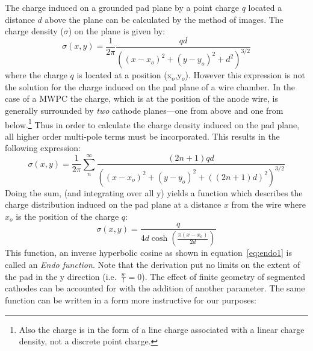 \documentclass[twoside]{article}
\begin{document}
The charge induced on a grounded pad plane by a point charge $q$ located
a distance $d$ above the plane can be calculated by the method of
images.  The charge density ($\sigma$) on the plane is given by:
\begin{equation}
  \sigma (x,y) = \frac{1}{2 \pi} \frac{q d}{((x-x_{o})^{2} + (y-y_{o})^{2} + d^{2})^{3/2}}
\label{eq:imageQ}
\end{equation}
where the charge $q$ is located at a position (x$_{o}$,y$_{o}$).  However
this expression is not the solution for the charge induced on the pad
plane of a wire chamber.  In the case of a MWPC the charge, which
is at the position of the anode wire, is generally surrounded by {\em two}
cathode planes---one from
above and one from below.\footnote{Also the charge is in the form of
  a line charge associated with a linear charge density, not a
  discrete point charge.}
Thus in order to calculate the charge density induced on the pad
plane, all higher order multi-pole terms must be incorporated.
This results in the following expression:
\begin{equation}
\sigma (x,y) = \frac{1}{2 \pi} \sum_{n}^{\infty} \frac{(2n+1) q d}{((x-x_{o})^{2} + (y-y_{o})^{2} + ((2n+1) d)^{2})^{3/2}}
\label{eq:imageQ2}
\end{equation}
Doing the sum, (and integrating over all y) yields a function
which describes the charge distribution induced on the
pad plane at a distance $x$ from the wire where $x_{o}$ is
the position of the charge $q$:
\begin{equation}
\sigma(x,y) = \frac{q}{4 d \cosh(\frac{\pi (x- x_{o})}{2 d})}
\label{eq:endo1}
\end{equation}
This function, an inverse hyperbolic cosine as shown in
equation~\ref{eq:endo1} is called an {\em Endo function}.  Note that the
derivation put no limits on the extent of the pad in the y direction
(i.e.~$\frac{w}{l}=0$).
The effect of finite geometry of segmented cathodes can be accounted
for with the addition of another parameter.  The same function can
be written in a form more instructive for our purposes:
\end{document}
